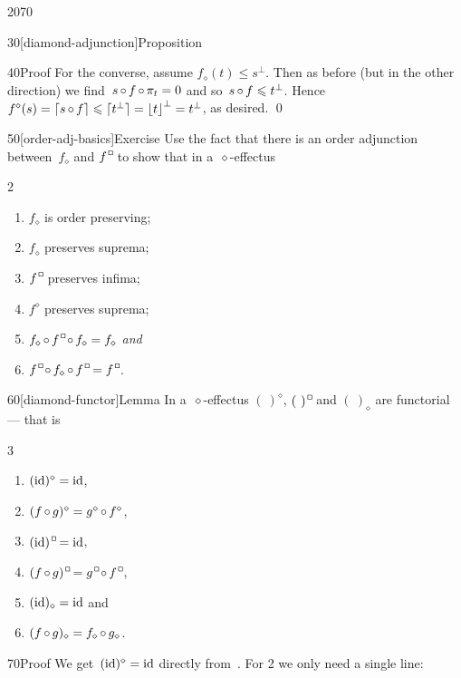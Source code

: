 \begin{parsec}{2070}
\begin{point}{30}[diamond-adjunction]{Proposition}
\begin{point}{40}{Proof}
For the converse, assume
    $f_\diamond(t) \leq s^\perp$.
Then as before (but in the other direction)
    we find~$s \mathop{\circ} f \mathop{\circ} \pi_t = 0$
    and so~$s \mathop{\circ} f \leqslant t^\perp$.
    Hence~$f^\diamond(s) =  \left\lceil s \mathop{\circ} f\right\rceil \leqslant \lceil t^\perp\rceil
                = \left\lfloor t\right\rfloor^\perp = t^\perp$, as desired. \qed
\end{point}
\end{point}
\begin{point}{50}[order-adj-basics]{Exercise}%
Use the fact that there is an
order adjunction between~$f_\diamond$ and $f^\BOX$
to show that in a~$\diamond$-effectus
\begin{multicols}{2}
\begin{enumerate}
    \item $f_\diamond$ is order preserving;
    \item $f_\diamond$ preserves suprema;
    \item $f^\BOX$ preserves infima;
    \item $f^\diamond$ preserves suprema;
    \item $f_\diamond \after f^\BOX \after f_\diamond = f_\diamond$ \emph{and}
    \item $f^\BOX \after f_\diamond \after f^\BOX = f^\BOX$.
\end{enumerate}
\end{multicols}
\end{point}
\begin{point}{60}[diamond-functor]{Lemma}%
    In a~$\diamond$-effectus
        $(\ )^\diamond$,
        $(\ )^\BOX$ and
        $(\ )_\diamond$
        are functorial --- that is
\begin{multicols}{3}
\begin{enumerate}
\item
$(\operatorname{id})^\diamond = \operatorname{id}$,
\item
$(f\mathop{\circ} g)^\diamond
            =   g^\diamond \mathop{\circ} f^\diamond$,
\item
$(\id)^\BOX = \id$,
\item
$(f\after g)^\BOX
            =   g^\BOX \after f^\BOX$,
\item
$(\operatorname{id})_\diamond= \operatorname{id}$ and
\item
            $(f \mathop{\circ} g)_\diamond = f_\diamond \mathop{\circ} g_\diamond$.
\end{enumerate}
\end{multicols}
\begin{point}{70}{Proof}%
We get~$(\operatorname{id})^\diamond = \operatorname{id}$
directly from~.
For 2 we only need a single line:

\end{point}
\end{point}
\end{parsec}
